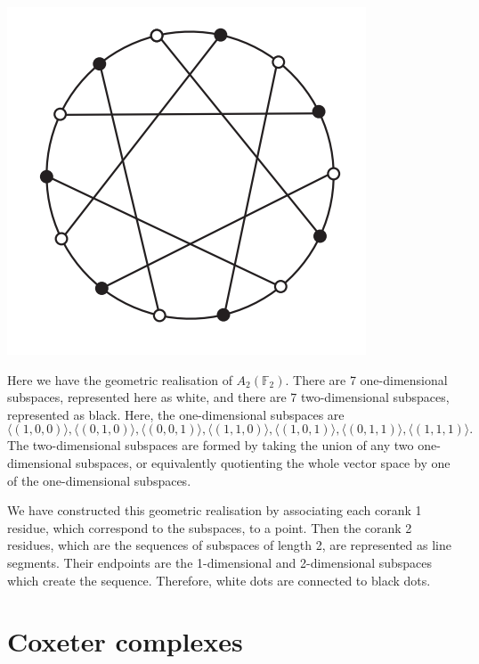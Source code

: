 \documentclass[11pt]{article}
\begin{document}
\begin{center}
\includegraphics[scale=0.7]{Screenshot 2023-03-16 131651.png}
\end{center}


\begin{example} \label{AnK}
    Here we have the geometric realisation of $A_2(\mathbb{F}_2)$. There are 7 one-dimensional subspaces, represented here as white, and there are 7 two-dimensional subspaces, represented as black. Here, the one-dimensional subspaces are
    \[\langle (1,0,0)\rangle, \langle (0,1,0)\rangle,\langle (0,0,1)\rangle,\langle (1,1,0)\rangle,\langle (1,0,1)\rangle,\langle (0,1,1)\rangle,\langle (1,1,1)\rangle.\]
    The two-dimensional subspaces are formed by taking the union of any two one-dimensional subspaces, or equivalently quotienting the whole vector space by one of the one-dimensional subspaces. 

    We have constructed this geometric realisation by associating each corank 1 residue, which correspond to the subspaces, to a point. Then the corank 2 residues, which are the sequences of subspaces of length 2, are represented as line segments. Their endpoints are the 1-dimensional and 2-dimensional subspaces which create the sequence. Therefore, white dots are connected to black dots.
\end{example}

\section{Coxeter complexes}
\end{document}
